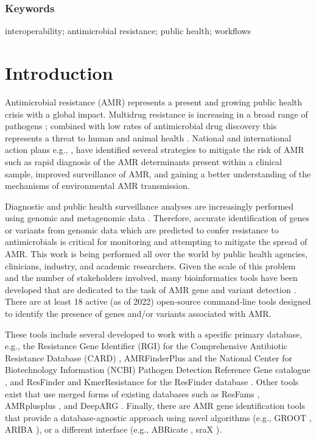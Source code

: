 \subsubsection{Keywords}

interoperability; antimicrobial resistance; public health; workflows

\section{Introduction}

Antimicrobial resistance (AMR) represents a present and growing public health crisis with a global impact. Multidrug resistance is increasing in a broad range of pathogens \cite{aslam_antibiotic_2018}; combined with low rates of antimicrobial drug discovery \cite{brown_antibacterial_2016} this represents a threat to human and animal health \cite{who_who_2015}. National and international action plans e.g., \cite{jim_oneill_antimicrobial_2014, jim_oneill_tackling_2016,public_health_agency_of_canada_antimicrobial_2014,who_who_2015}, have identified several strategies to mitigate the risk of AMR such as rapid diagnosis of the AMR determinants present within a clinical sample, improved surveillance of AMR, and gaining a better understanding of the mechanisms of environmental AMR transmission.

Diagnostic and public health surveillance analyses are increasingly performed using genomic and metagenomic data \cite{mcarthur_antimicrobial_2017}. Therefore, accurate identification of genes or variants from genomic data which are predicted to confer resistance to antimicrobials is critical for monitoring and attempting to mitigate the spread of AMR. This work is being performed all over the world by public health agencies, clinicians, industry, and academic researchers. Given the scale of this problem and the number of stakeholders involved, many bioinformatics tools have been developed that are dedicated to the task of AMR gene and variant detection \cite{boolchandani_sequencing-based_2019,hendriksen_using_2019,mcarthur_antimicrobial_2017}. There are at least 18 active (as of 2022) open-source command-line tools designed to identify the presence of genes and/or variants associated with AMR.  

These tools include several developed to work with a specific primary database, e.g., the Resistance Gene Identifier (RGI) for the Comprehensive Antibiotic Resistance Database (CARD) \cite{alcock_card_2020}, AMRFinderPlus and the National Center for Biotechnology Information (NCBI) Pathogen Detection Reference Gene catalogue \cite{feldgarden_validating_2019}, and ResFinder and KmerResistance \cite{clausen_benchmarking_2016} for the ResFinder database \cite{zankari_identification_2012}.  Other tools exist that use merged forms of existing databases such as ResFams \cite{gibson_improved_2015}, AMRplusplus \cite{doster_megares_2020}, and DeepARG \cite{arango-argoty_deeparg_2018}. Finally, there are AMR gene identification tools that provide a database-agnostic approach using novel algorithms (e.g., GROOT \cite{rowe_indexed_2018}, ARIBA \cite{hunt_ariba_2017}), or a different interface (e.g., ABRicate \cite{torsten_seeman_abricate_2020}, sraX \cite{panunzi_srax_2020}). 

